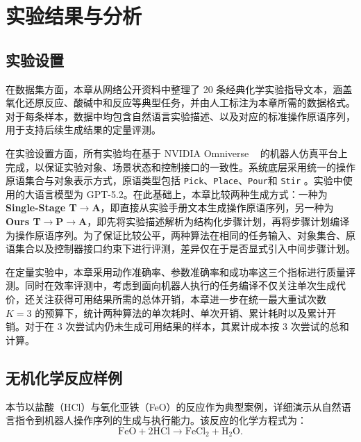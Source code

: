 \section{实验结果与分析}
\label{sec:ch5_results_analysis}

\subsection{实验设置}

在数据集方面，本章从网络公开资料中整理了 20 条经典化学实验指导文本，涵盖氧化还原反应、酸碱中和反应等典型任务，并由人工标注为本章所需的数据格式。对于每条样本，数据中均包含自然语言实验描述、以及对应的标准操作原语序列，用于支持后续生成结果的定量评测。

在实验设置方面，所有实验均在基于 NVIDIA Omniverse ~\cite{nvidia2026isaacsim} 的机器人仿真平台上完成，以保证实验对象、场景状态和控制接口的一致性。系统底层采用统一的操作原语集合与对象表示方式，原语类型包括 \texttt{Pick}、\texttt{Place}、\texttt{Pour}和 \texttt{Stir} 。实验中使用的大语言模型为 GPT-5.2。在此基础上，本章比较两种生成方式：一种为 \textbf{Single-Stage T$\rightarrow$A}，即直接从实验手册文本生成操作原语序列，另一种为 \textbf{Ours T$\rightarrow$P$\rightarrow$A}，即先将实验描述解析为结构化步骤计划，再将步骤计划编译为操作原语序列。为了保证比较公平，两种算法在相同的任务输入、对象集合、原语集合以及控制器接口约束下进行评测，差异仅在于是否显式引入中间步骤计划。

在定量实验中，本章采用动作准确率、参数准确率和成功率这三个指标进行质量评测。同时在效率评测中，考虑到面向机器人执行的任务编译不仅关注单次生成代价，还关注获得可用结果所需的总体开销，本章进一步在统一最大重试次数 $K=3$ 的预算下，统计两种算法的单次耗时、单次开销、累计耗时以及累计开销。对于在 3 次尝试内仍未生成可用结果的样本，其累计成本按 3 次尝试的总和计算。

  
\subsection{无机化学反应样例}
\label{sec:ch5_inorg_case_hcl_feo}
本节以盐酸（HCl）与氧化亚铁（FeO）的反应作为典型案例，详细演示从自然语言指令到机器人操作序列的生成与执行能力。该反应的化学方程式为：
\begin{equation}
\mathrm{FeO} + 2\mathrm{HCl} \rightarrow \mathrm{FeCl_2} + \mathrm{H_2O}.
\label{eq:ch5_hcl_feo_reaction}
\end{equation}

